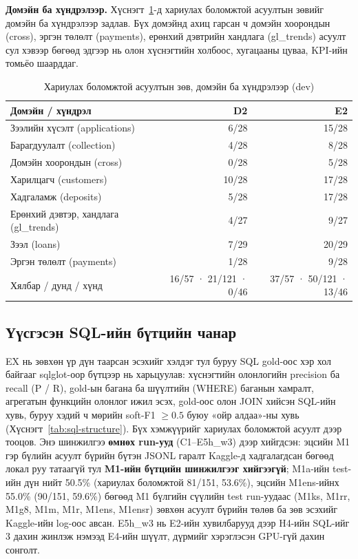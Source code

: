 \textbf{Домэйн ба хүндрэлээр.} Хүснэгт~\ref{tab:by-domain}-д хариулах боломжтой асуултын зөвийг домэйн ба хүндрэлээр
задлав. Бүх домэйнд ахиц гарсан ч домэйн хоорондын (cross), эргэн төлөлт (payments), ерөнхий дэвтрийн хандлага (gl\_trends)
асуулт сул хэвээр бөгөөд эдгээр нь олон хүснэгтийн холбоос, хугацааны цуваа, KPI-ийн томьёо шаарддаг.

\begin{table}[H]
\centering\small
\caption{Хариулах боломжтой асуултын зөв, домэйн ба хүндрэлээр (dev)}
\label{tab:by-domain}
\begin{tabularx}{\textwidth}{X r r}
\toprule
Домэйн / хүндрэл & D2 & E2 \\
\midrule
Зээлийн хүсэлт (applications) & 6/28 & 15/28 \\
Барагдуулалт (collection) & 4/28 & 8/28 \\
Домэйн хоорондын (cross) & 0/28 & 5/28 \\
Харилцагч (customers) & 10/28 & 17/28 \\
Хадгаламж (deposits) & 5/28 & 17/28 \\
Ерөнхий дэвтэр, хандлага (gl\_trends) & 4/27 & 9/27 \\
Зээл (loans) & 7/29 & 20/29 \\
Эргэн төлөлт (payments) & 1/28 & 9/28 \\
\midrule
Хялбар / дунд / хүнд & 16/57 · 21/121 · 0/46 & 37/57 · 50/121 · 13/46 \\
\bottomrule
\end{tabularx}
\end{table}

\subsection{Үүсгэсэн SQL-ийн бүтцийн чанар}
\label{sec:sql-quality}

EX нь зөвхөн үр дүн таарсан эсэхийг хэлдэг тул буруу SQL gold-оос хэр хол байгааг sqlglot-оор бүтцээр нь харьцуулав:
хүснэгтийн олонлогийн precision ба recall (P / R), gold-ын багана ба шүүлтийн (WHERE) баганын хамралт, агрегатын функцийн
олонлог ижил эсэх, gold-оос олон JOIN хийсэн SQL-ийн хувь, буруу хэдий ч мөрийн soft-F1 $\geq 0.5$ буюу «ойр алдаа»-ны
хувь (Хүснэгт~\ref{tab:sql-structure}). Бүх хэмжүүрийг хариулах боломжтой асуулт дээр тооцов. Энэ шинжилгээ
\textbf{өмнөх run-ууд} (C1--E5h\_w3) дээр хийгдсэн: эцсийн M1 гэр бүлийн асуулт бүрийн бүтэн JSONL гаралт Kaggle-д
хадгалагдсан бөгөөд локал руу татаагүй тул \textbf{M1-ийн бүтцийн шинжилгээг хийгээгүй}; M1a-ийн test-ийн дүн нийт 50.5\%
(хариулах боломжтой 81/151, 53.6\%), эцсийн M1ens-ийнх 55.0\% (90/151, 59.6\%) бөгөөд M1 бүлгийн сүүлийн test run-уудаас
(M1ks, M1rr, M1g8, M1m, M1r, M1ens, M1ensr) зөвхөн асуулт бүрийн төлөв ба зөв эсэхийг Kaggle-ийн log-оос авсан. E5h\_w3 нь
E2-ийн хувилбарууд дээр H4-ийн SQL-ийг 3 дахин жинлэж нэмээд E4-ийн шүүлт, дүрмийг хэрэглэсэн GPU-гүй дахин сонголт.

